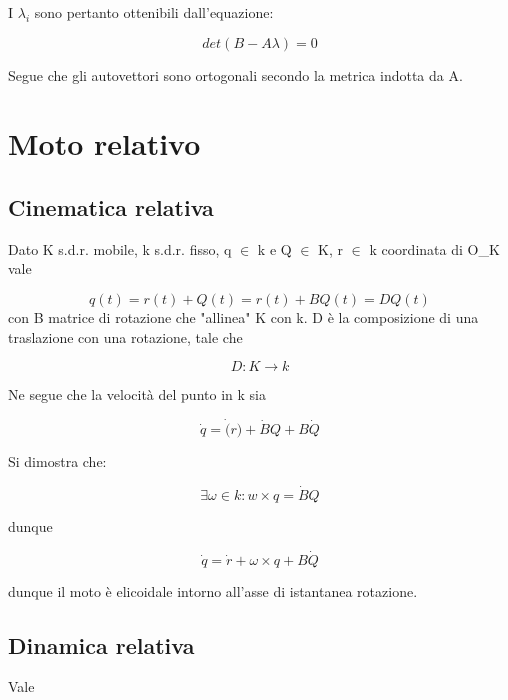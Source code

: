\documentclass{article}
\begin{document}
I $\lambda_i$ sono pertanto ottenibili dall'equazione:

\begin{equation}
    det(B-A\lambda)=0
\end{equation}

Segue che gli autovettori sono ortogonali secondo la metrica indotta da A.

\section{Moto relativo}
\subsection{Cinematica relativa}
Dato K s.d.r. mobile, k s.d.r. fisso, q $\in$ k e Q $\in$ K, r $\in$ k coordinata di O\_K vale

\begin{equation}
    q(t)=r(t)+Q(t)= r(t)+ BQ(t)= DQ(t)
\end{equation}
con B matrice di rotazione che "allinea" K con k. D è la composizione di una traslazione con una rotazione, tale che

\begin{equation}
    D: K \rightarrow k
\end{equation}

Ne segue che la velocità del punto in k sia

\begin{equation}
    \dot{q}= \dot(r)+\dot{B}Q+ B\dot{Q}
\end{equation}

Si dimostra che:

\begin{equation}
    \exists \omega \in k : w \times q= \dot{B}Q 
\end{equation}

dunque

\begin{equation}
    \dot{q}= \dot{r}+\omega \times q+ B\dot{Q}
\end{equation}

dunque il moto è elicoidale intorno all'asse di istantanea rotazione.

\subsection{Dinamica relativa}
Vale
\end{document}
